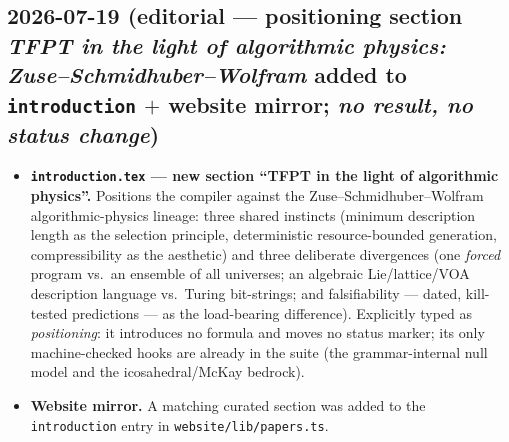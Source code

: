 \documentclass[11pt]{article}
\begin{document}
\subsection*{2026-07-19 (editorial --- positioning section \emph{TFPT in the light of algorithmic physics: Zuse--Schmidhuber--Wolfram} added to \texttt{introduction} $+$ website mirror; \emph{no result, no status change})}
\begin{itemize}[leftmargin=1.5em]
\item \textbf{\texttt{introduction.tex} --- new section ``TFPT in the light of algorithmic physics''.} Positions the
compiler against the Zuse--Schmidhuber--Wolfram algorithmic-physics lineage: three shared instincts (minimum
description length as the selection principle, deterministic resource-bounded generation, compressibility as the
aesthetic) and three deliberate divergences (one \emph{forced} program vs.\ an ensemble of all universes; an
algebraic Lie/lattice/VOA description language vs.\ Turing bit-strings; and falsifiability --- dated, kill-tested
predictions --- as the load-bearing difference). Explicitly typed as \emph{positioning}: it introduces no formula and
moves no status marker; its only machine-checked hooks are already in the suite (the grammar-internal null model and
the icosahedral/McKay bedrock).
\item \textbf{Website mirror.} A matching curated section was added to the \texttt{introduction} entry in
\texttt{website/lib/papers.ts}.
\end{itemize}
\end{document}
